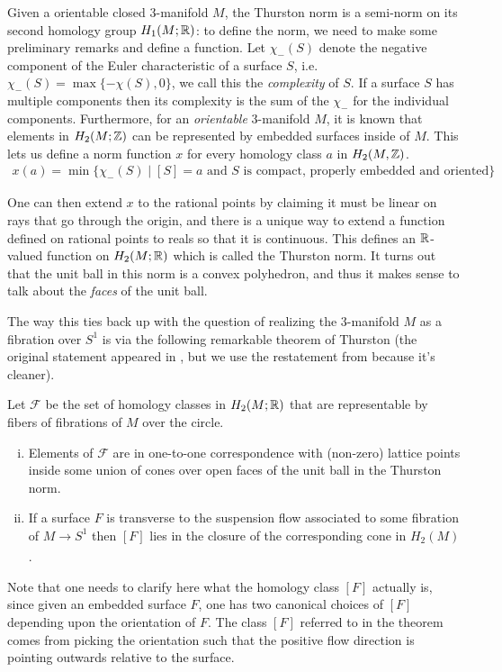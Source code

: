 Given a orientable closed $3$-manifold $M$, the Thurston norm is a semi-norm on its second homology
group $H_1(M; \mathbb{R})$: to define the norm, we need to make some preliminary remarks and define a
function.  Let $\chi_-(S)$ denote the negative component of the Euler characteristic of a surface
$S$, i.e. $\chi_-(S) = \max\{-\chi(S),0\}$, we call this the \textit{complexity} of $S$. If a
surface $S$ has multiple components then its complexity is the sum of the $\chi_-$ for the
individual components.  Furthermore, for an \emph{orientable} 3-manifold $M$, it is known that
elements in $H_2(M ; \mathbb{Z})$ can be represented by embedded surfaces inside of $M$. This lets us
define a norm function $x$ for every homology class $a$ in $H_2(M, \mathbb{Z})$.
\begin{align*}
  x(a) = \min\{\chi_-(S) \mid [S] = a \text{ and $S$ is compact, properly embedded and oriented}\}
\end{align*}

One can then extend $x$ to the rational points by claiming it must be linear on rays that go through
the origin, and there is a unique way to extend a function defined on rational points to reals so
that it is continuous. This defines an $\mathbb{R}$-valued function on $H_2(M; \mathbb{R})$ which is called the
Thurston norm. It turns out that the unit ball in this norm is a convex polyhedron, and thus it makes
sense to talk about the \emph{faces} of the unit ball.

The way this ties back up with the question of realizing the $3$-manifold $M$ as a fibration over
$S^1$ is via the following remarkable theorem of Thurston (the original statement appeared in
\cite{thurston1986norm}, but we use the restatement from \cite{yazdi2018pseudo} because it's
cleaner).

\begin{thm}[Thurston]
  \label{thm:Thur1}
  Let $\mathcal{F}$ be the set of homology classes in $H_2(M; \mathbb{R})$ that are representable by fibers of
  fibrations of $M$ over the circle.
\begin{enumerate}[(i)]
\item Elements of $\mathcal{F}$ are in one-to-one correspondence with (non-zero) lattice points
  inside some union of cones over open faces of the unit ball in the Thurston norm.
\item If a surface $F$ is transverse to the suspension flow associated to some fibration of
  $M \xrightarrow[]{} S^1$ then $[F]$ lies in the closure of the corresponding cone in $H_2(M)$.
\end{enumerate}
\end{thm}
Note that one needs to clarify here what the homology class $[F]$ actually is, since given an
embedded surface $F$, one has two canonical choices of $[F]$ depending upon the orientation
of $F$. The class $[F]$ referred to in the theorem comes from picking the orientation such
that the positive flow direction is pointing outwards relative to the surface.

